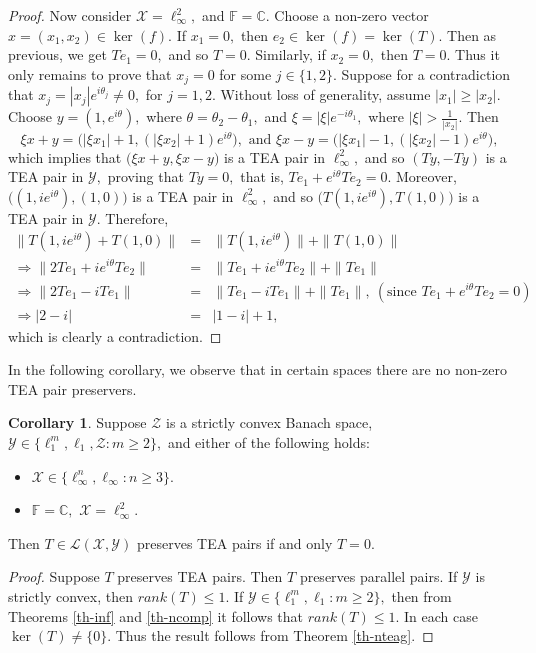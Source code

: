 \documentclass{amsart}
\theoremstyle{definition}
\newtheorem{cor}[theorem]{Corollary}
\theoremstyle{remark}
\numberwithin{equation}{section}
\begin{document}
\begin{proof}
	\noindent Now consider $\mathcal{X}=\ell_\infty^2,$ and $\mathbb{F}=\mathbb{C}.$  Choose a non-zero vector $x=(x_1,x_2)\in \ker(f).$ If $x_1=0,$ then $e_2\in \ker(f)=\ker(T).$ Then as previous, we get $Te_1=0,$ and so $T=0.$ Similarly, if $x_2=0,$ then $T=0.$ Thus it only remains to prove that $x_j=0$ for some $j\in \{1,2\}.$  Suppose for a contradiction that $x_j=|x_j|e^{i\theta_j}\neq 0,$ for $j=1,2.$ Without loss of generality, assume $|x_1|\geq |x_2|.$ Choose $y=(1,e^{i\theta}),$ where $\theta=\theta_2-\theta_1,$ and $\xi =|\xi|e^{-i\theta_1},$ where $|\xi|>\frac{1}{|x_2|}.$ Then $$\xi x+y=\Big(|\xi x_1|+1, (|\xi x_2|+1)e^{i\theta}\Big),\text{ and  }\xi x-y=\Big(|\xi x_1|-1, (|\xi x_2|-1)e^{i\theta}\Big),$$
	which implies that $\Big(\xi x+y,\xi x-y\Big)$ is a TEA pair in $\ell_\infty^2,$ and so $(Ty,-Ty)$ is a TEA pair in $\mathcal{Y},$ proving that $Ty=0,$ that is, $Te_1+e^{i\theta}Te_2=0.$ Moreover, $\Big((1,ie^{i\theta}),(1,0)\Big)$ is a TEA pair in $\ell_\infty^2,$ and so $\Big(T(1,ie^{i\theta}),T(1,0)\Big)$ is a TEA pair in $\mathcal{Y}.$ Therefore,
	\begin{eqnarray*}
		\|T(1,ie^{i\theta})+T(1,0)\|&=&\|T(1,ie^{i\theta})\|+\|T(1,0)\|\\
		\Rightarrow \|2Te_1+ie^{i\theta}Te_2\|&=&\|Te_1+ie^{i\theta}Te_2\|+\|Te_1\|\\
		\Rightarrow \|2Te_1-iTe_1\|&=&\|Te_1-iTe_1\|+\|Te_1\|, ~(\text{since } Te_1+e^{i\theta}Te_2=0) \\
		\Rightarrow |2-i|&=&|1-i|+1,
	\end{eqnarray*}
	which is clearly a contradiction.
\end{proof}

In the following corollary, we observe that in certain spaces there are no non-zero TEA pair preservers. 
\begin{cor}\label{cor-ntea}
	Suppose $\mathcal{Z}$ is a strictly convex Banach space, $\mathcal{Y}\in \{\ell_1^m,\ell_1, \mathcal{Z}:m\geq 2\},$ and either of the following holds:
	\begin{itemize}
		\item $\mathcal{X}\in \{\ell_\infty^n,\ell_\infty:n\geq 3\}.$ 
		\item $\mathbb{F}=\mathbb{C},$ $\mathcal{X}=\ell_\infty^2.$
	\end{itemize}
	Then  $T\in\mathcal{L}(\mathcal{X}, \mathcal{Y})$ preserves TEA pairs if and only $T=0.$
\end{cor}
\begin{proof}
	Suppose $T$ preserves TEA pairs. Then $T$ preserves parallel pairs. If $\mathcal{Y}$ is strictly convex, then $rank(T)\leq1.$ If $\mathcal{Y}\in \{\ell_1^m,\ell_1:m\geq 2\},$ then from Theorems \ref{th-inf} and \ref{th-ncomp} it follows that $rank(T)\leq1.$  In each case $\ker(T)\neq \{0\}.$ Thus the result follows from Theorem \ref{th-nteag}.
\end{proof}
\end{document}
